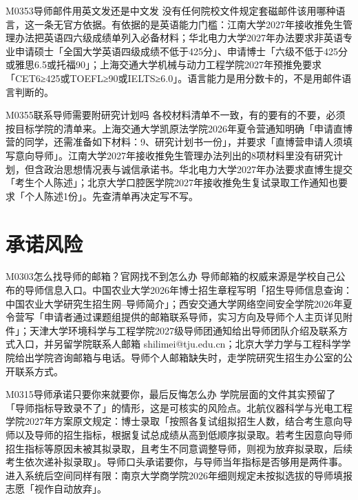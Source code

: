 \begin{qa}{M0353}{导师邮件用英文发还是中文发}
没有任何院校文件规定套磁邮件该用哪种语言，这一条无官方依据。有依据的是英语能力门槛：江南大学2027年接收推免生管理办法把英语四六级成绩单列入必备材料；华北电力大学2027年办法要求非英语专业申请硕士「全国大学英语四级成绩不低于425分」、申请博士「六级不低于425分或雅思6.5或托福90」；上海交通大学机械与动力工程学院2027年预推免要求「CET6≥425或TOEFL≥90或IELTS≥6.0」。语言能力是用分数卡的，不是用邮件语言判断的。
\end{qa}

\begin{qa}{M0355}{联系导师需要附研究计划吗}
各校材料清单不一致，有的要有的不要，必须按目标学院的清单来。上海交通大学凯原法学院2026年夏令营通知明确「申请直博营的同学，还需准备如下材料：9、研究计划书一份」，并要求「直博营申请人须填写意向导师」。江南大学2027年接收推免生管理办法列出的8项材料里没有研究计划，但含政治思想情况表与诚信承诺书。华北电力大学2027年办法要求直博生提交「考生个人陈述」；北京大学口腔医学院2027年接收推免生复试录取工作通知也要求「个人陈述1份」。先查清单再决定写不写。
\end{qa}

\section{承诺风险}
\begin{qa}{M0303}{怎么找导师的邮箱？官网找不到怎么办}
导师邮箱的权威来源是学校自己公布的导师信息入口。中国农业大学2026年博士招生章程写明「招生导师信息查询：中国农业大学研究生招生网--导师简介」；西安交通大学网络空间安全学院2026年夏令营写「申请者通过课题组提供的邮箱联系导师，实习方向及导师个人主页详见附件」；天津大学环境科学与工程学院2027级导师团通知给出导师团队介绍及联系方式入口，并另留学院联系人邮箱 shilimei@tju.edu.cn；北京大学力学与工程科学学院给出学院咨询邮箱与电话。导师个人邮箱缺失时，走学院研究生招生办公室的公开联系方式。
\end{qa}

\begin{qa}{M0315}{导师承诺只要你来就要你，最后反悔怎么办}
学院层面的文件其实预留了「导师指标导致录不了」的情形，这是可核实的风险点。北航仪器科学与光电工程学院2027年方案原文规定：博士录取「按照各复试组拟招生人数，结合考生意向导师以及导师的招生指标，根据复试总成绩从高到低顺序拟录取。若考生因意向导师招生指标等原因未被其拟录取，且考生不同意调整导师，则视为放弃拟录取，后续考生依次递补拟录取」。导师口头承诺要你，与导师当年指标是否够用是两件事。进入系统后空间同样有限：南京大学商学院2026年细则规定未按拟选拔的导师填报志愿「视作自动放弃」。
\end{qa}

